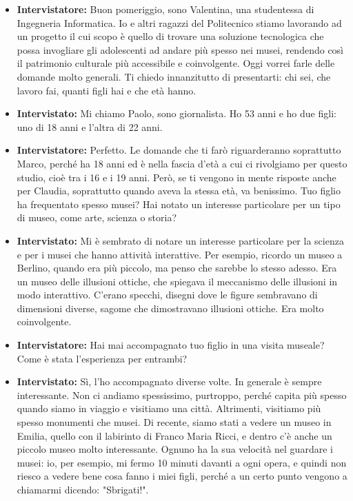\documentclass{article}
\begin{document}
\begin{itemize}
    \item \textbf{Intervistatore:} Buon pomeriggio, sono Valentina, una studentessa di Ingegneria Informatica. Io e altri ragazzi del Politecnico stiamo lavorando ad un progetto il cui scopo è quello di trovare una soluzione tecnologica che possa invogliare gli adolescenti ad andare più spesso nei musei, rendendo così il patrimonio culturale più accessibile e coinvolgente. Oggi vorrei farle delle domande molto generali. Ti chiedo innanzitutto di presentarti: chi sei, che lavoro fai, quanti figli hai e che età hanno.
    \item \textbf{Intervistato:} Mi chiamo Paolo, sono giornalista. Ho 53 anni e ho due figli: uno di 18 anni e l'altra di 22 anni.
    \item \textbf{Intervistatore:} Perfetto. Le domande che ti farò riguarderanno soprattutto Marco, perché ha 18 anni ed è nella fascia d'età a cui ci rivolgiamo per questo studio, cioè tra i 16 e i 19 anni. Però, se ti vengono in mente risposte anche per Claudia, soprattutto quando aveva la stessa età, va benissimo. Tuo figlio ha frequentato spesso musei? Hai notato un interesse particolare per un tipo di museo, come arte, scienza o storia?
    \item \textbf{Intervistato:} Mi è sembrato di notare un interesse particolare per la scienza e per i musei che hanno attività interattive. Per esempio, ricordo un museo a Berlino, quando era più piccolo, ma penso che sarebbe lo stesso adesso. Era un museo delle illusioni ottiche, che spiegava il meccanismo delle illusioni in modo interattivo. C'erano specchi, disegni dove le figure sembravano di dimensioni diverse, sagome che dimostravano illusioni ottiche. Era molto coinvolgente.
    \item \textbf{Intervistatore:} Hai mai accompagnato tuo figlio in una visita museale? Come è stata l'esperienza per entrambi?
    \item \textbf{Intervistato:} Sì, l'ho accompagnato diverse volte. In generale è sempre interessante. Non ci andiamo spessissimo, purtroppo, perché capita più spesso quando siamo in viaggio e visitiamo una città. Altrimenti, visitiamo più spesso monumenti che musei. Di recente, siamo stati a vedere un museo in Emilia, quello con il labirinto di Franco Maria Ricci, e dentro c'è anche un piccolo museo molto interessante. Ognuno ha la sua velocità nel guardare i musei: io, per esempio, mi fermo 10 minuti davanti a ogni opera, e quindi non riesco a vedere bene cosa fanno i miei figli, perché a un certo punto vengono a chiamarmi dicendo: "Sbrigati!".

\end{itemize}
\end{document}
